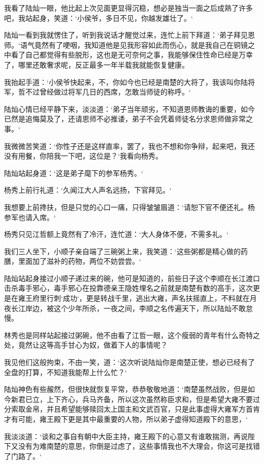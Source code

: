 我看了陆灿一眼，他比起上次见面更显得沉稳，想必是独当一面之后成熟了许多吧，我站起身，笑道：‘小侯爷，多日不见，你越发雄壮了。‘

陆灿一看到我就愣住了，听到我说话才醒觉过来，连忙上前下拜道：‘弟子拜见恩师。‘语气竟然有了哽咽，我知道他是见我形容如此而伤心，就是我自己在铜镜之中看了自己都觉得有些脱形，这也是无可奈何之事，我能够保住性命已经是万幸了，哪里还敢奢求呢，反正最多一年半载我就能恢复健康。

我抬起手道：‘小侯爷快起来，不，你如今也已经是南楚的大将了，我该叫你陆将军，哲不过曾经做过将军几日的西席，怎敢当师徒的称呼。‘

陆灿心情已经平静下来，淡淡道：‘弟子当年顽劣，不知道恩师教诲的重要，如今已然是追悔莫及了，还请恩师不必推诿，弟子不会凭着师徒名分求恩师做非常之事。‘

我微微苦笑道：‘你性子还是这样直率，罢了，我也不想和你争辩，起来吧，我还没有用餐，你陪我一下吧，这位是？‘我看向杨秀。

陆灿站起身道：‘这是弟子麾下的参军杨秀。‘

杨秀上前行礼道：‘久闻江大人声名远扬，下官拜见。‘

我想要上前搀扶，但是只觉的心口一痛，只得皱皱眉道：‘请恕下官不便还礼。杨参军也请入席。‘

杨秀只见江哲额上竟然有了冷汗，连忙道：‘大人身体不便，不需多礼。‘

我们三人坐下，小顺子亲自端了三碗粥上来，我笑道：‘这些粥都是精心做的药膳，里面加了滋补的药物，两位不妨尝尝。‘

陆灿站起身接过小顺子递过来的碗，他可是知道的，前些日子这个李顺在长江渡口击杀毒手邪心，毒手邪心在投靠德亲王隐姓埋名之前就是南楚有数的高手，这次更是在雍王府里行刺‘成功‘，更是转战千里，逃出大雍，声名扶摇直上，不料就在月夜长江岸边，被这个少年所杀，一夜之间，李顺之名传遍天下，所以陆灿不敢怠慢。

林秀也是同样站起接过粥碗，他不由看了江哲一眼，这个瘦弱的青年有什么奇特之处，竟然让这等高手甘心为奴，做着下人的事情呢？

我见他们这般拘束，不由一笑，道：‘这次听说陆灿你是南楚正使，想必已经有了全盘的打算，不知道我能帮上什么忙？‘

陆灿神色有些赧然，但很快就恢复平常，恭恭敬敬地道：‘南楚虽然战败，但是如今新君已立，上下齐心，兵马齐备，所以这次虽然称臣求和，但是希望大雍不要过分索取金帛，并且希望能够赎回太上国主和文武百官，只是此事虚得大雍军方首肯才有可能，雍王殿下更是其中最重要的人物，所以弟子虚得知道殿下的意思，‘

我淡淡道：‘谈和之事自有朝中大臣主持，雍王殿下的心意又有谁敢揣测，再说陛下又没有为难南楚的意思，你倒是过虑了，这些事情我也不大理会，你这可是找错了门路了。‘

